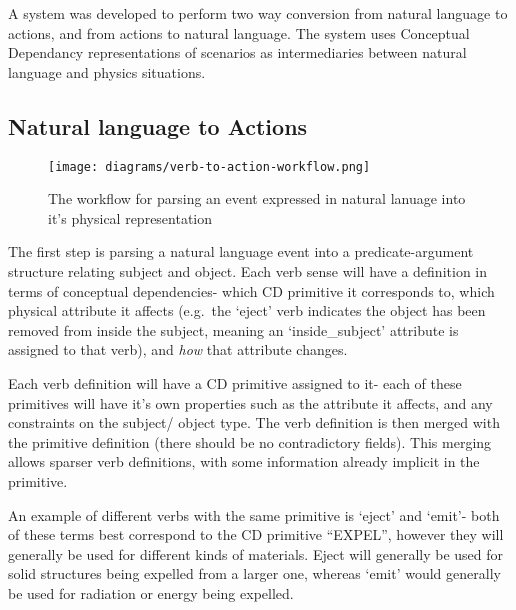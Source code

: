 
% 

    A system was developed to perform two way conversion from natural language to actions, and from actions to natural language. The system uses Conceptual Dependancy representations of scenarios as intermediaries between natural language and physics situations.

    \subsection{Natural language to Actions}
    \begin{figure}[h]
        \begin{center}
            \texttt{[image: diagrams/verb-to-action-workflow.png]}
        \end{center}
        \caption{The workflow for parsing an event expressed in natural lanuage into it's physical representation}
    \end{figure}

    The first step is parsing a natural language event into a predicate-argument structure relating subject and object. Each verb sense will have a definition in terms of conceptual dependencies- which CD primitive it corresponds to, which physical attribute it affects (e.g.~the `eject' verb indicates the object has been removed from inside the subject, meaning an `inside\_subject' attribute is assigned to that verb), and \emph{how} that attribute changes.

    Each verb definition will have a CD primitive assigned to it- each of these primitives will have it's own properties such as the attribute it affects, and any constraints on the subject/ object type. The verb definition is then merged with the primitive definition (there should be no contradictory fields). This merging allows sparser verb definitions, with some information already implicit in the primitive.

    An example of different verbs with the same primitive is `eject' and `emit'- both of these terms best correspond to the CD primitive ``EXPEL'', however they will generally be used for different kinds of materials. Eject will generally be used for solid structures being expelled from a larger one, whereas `emit' would generally be used for radiation or energy being expelled.

